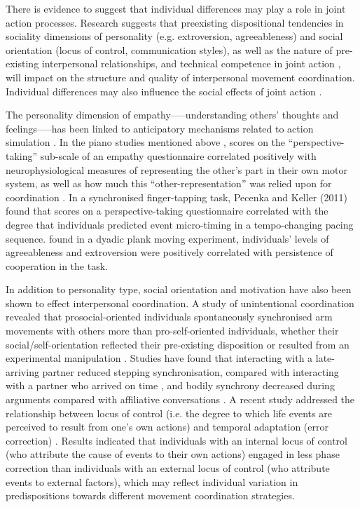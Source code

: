 \begin{CJK}{UTF8}{gbsn}
There is evidence to suggest that individual differences may play a role in joint action processes.  Research suggests that preexisting dispositional tendencies in sociality dimensions of personality (e.g. extroversion, agreeableness) and social orientation (locus of control, communication styles), as well as the nature of pre-existing interpersonal relationships, and technical competence in joint action \citep{Novembre2014}, will impact on the structure and quality of interpersonal movement coordination.  Individual differences may also influence the social effects of joint action \citep{Marsh2009}.

The personality dimension of empathy—--understanding others’ thoughts and feelings—--has been linked to anticipatory mechanisms related to action simulation \citep{Sevdalis2014,Keller2014}.  In the piano studies mentioned above \citep{Novembre2012}, scores on the ``perspective-taking'' sub-scale of an empathy questionnaire correlated positively with neurophysiological measures of representing the other’s part in their own motor system, as well as how much this ``other-representation'' was relied upon for coordination \citep{Novembre2014a}.  In a synchronised finger-tapping task, Pecenka and Keller (2011) found that scores on a perspective-taking questionnaire correlated with the degree that individuals predicted event micro-timing in a tempo-changing pacing sequence.  \textcite{Richardson2007} found in a dyadic plank moving experiment, individuals’ levels of agreeableness and extroversion were positively correlated with persistence of cooperation in the task.

In addition to personality type, social orientation and motivation have also been shown to effect interpersonal coordination.  A study of unintentional coordination revealed that prosocial-oriented individuals spontaneously synchronised arm movements with others more than pro-self-oriented individuals, whether their social/self-orientation reflected their pre-existing disposition or resulted from an experimental manipulation \citep{Lumsden2012}.  Studies have found that interacting with a late-arriving partner reduced stepping synchronisation, compared with interacting with a partner who arrived on time \citep{Miles2010}, and bodily synchrony decreased during arguments compared with affiliative conversations \citep{Paxton2013}.  A recent study addressed the relationship between locus of control (i.e. the degree to which life events are perceived to result from one’s own actions) and temporal adaptation (error correction) \citep{Fairhurst2014}.   Results indicated that individuals with an internal locus of control (who attribute the cause of events to their own actions) engaged in less phase correction than individuals with an external locus of control (who attribute events to external factors), which may reflect individual variation in predispositions towards different movement coordination strategies.


\end{CJK}
